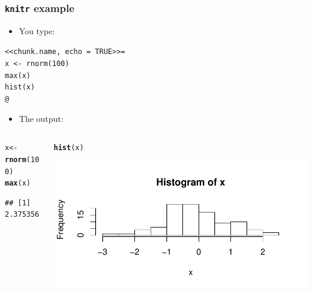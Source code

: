\documentclass{beamer}\usepackage[]{graphicx}\usepackage[]{color}
\makeatletter
\newcommand{\hlnum}[1]{\textcolor[rgb]{0.686,0.059,0.569}{#1}}%
\newcommand{\hlstd}[1]{\textcolor[rgb]{0.345,0.345,0.345}{#1}}%
\newcommand{\hlkwb}[1]{\textcolor[rgb]{0.69,0.353,0.396}{#1}}%
\newcommand{\hlkwd}[1]{\textcolor[rgb]{0.737,0.353,0.396}{\textbf{#1}}}%
\newenvironment{kframe}{%
 \def\at@end@of@kframe{}%
 \ifinner\ifhmode%
  \def\at@end@of@kframe{\end{minipage}}%
  \begin{minipage}{\columnwidth}%
 \fi\fi%
 \def\FrameCommand##1{\hskip\@totalleftmargin \hskip-\fboxsep
 \colorbox{shadecolor}{##1}\hskip-\fboxsep
     \hskip-\linewidth \hskip-\@totalleftmargin \hskip\columnwidth}%
 \MakeFramed {\advance\hsize-\width
   \@totalleftmargin\z@ \linewidth\hsize
   \@setminipage}}%
 {\par\unskip\endMakeFramed%
 \at@end@of@kframe}
\newenvironment{knitrout}{}{} %
\makeatother
\begin{document}
\begin{frame}[fragile, label=c]
\frametitle[knitr example]{\texttt{knitr} example}

	\begin{itemize}
		\item You type:
	\end{itemize}
\texttt{<<chunk.name, echo = TRUE>>=} \\
\texttt{x <- rnorm(100)} \\
\texttt{max(x)} \\
\texttt{hist(x)} \\
\texttt{@}

	\begin{itemize}
		\item The output:
	\end{itemize}
	
	\vspace{-5mm}
	\begin{columns}
		\begin{column}{0.5\textwidth}
\begin{knitrout}\small
{}\color{fgcolor}\begin{kframe}
\begin{alltt}
\hlstd{x} \hlkwb{<-} \hlkwd{rnorm}\hlstd{(}\hlnum{100}\hlstd{)}
\hlkwd{max}\hlstd{(x)}
\end{alltt}
\begin{verbatim}
## [1] 2.375356
\end{verbatim}
\end{kframe}
\end{knitrout}
		\vspace{18mm}
		\end{column}
		\begin{column}{0.5\textwidth}
\begin{knitrout}\small
{}\color{fgcolor}\begin{kframe}
\begin{alltt}
\hlkwd{hist}\hlstd{(x)}
\end{alltt}
\end{kframe}

{\centering \includegraphics[width=1\linewidth]{figure/chunk_name2-1} 

}



\end{knitrout}
		\end{column}
	\end{columns}

\end{frame}
\end{document}
